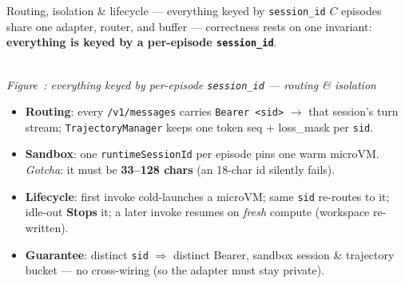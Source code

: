 \documentclass[aspectratio=169]{beamer}
\newcounter{deckfig}
\newcommand{\figtag}[1]{\refstepcounter{deckfig}%
  {\scriptsize\itshape Figure~\thedeckfig: #1}}
\begin{document}
\begin{frame}{Routing, isolation \& lifecycle --- everything keyed by \texttt{session\_id}}
  \footnotesize $C$ episodes share one adapter, router, and buffer --- correctness rests on one invariant:
  \textbf{everything is keyed by a per-episode \texttt{session\_id}}.
  \begin{center}
  \\[0.1em]\figtag{everything keyed by per-episode \texttt{session\_id} --- routing \& isolation}
  \end{center}
  \vspace{-0.35em}
  \begin{itemize}\setlength\itemsep{0.08em}
    \item \textbf{Routing}: every \texttt{/v1/messages} carries \texttt{Bearer <sid>} $\to$ that session's
      turn stream; \texttt{TrajectoryManager} keeps one token seq + loss\_mask per \texttt{sid}.
    \item \textbf{Sandbox}: one \texttt{runtimeSessionId} per episode pins one warm microVM. \emph{Gotcha}:
      it must be \textbf{33--128 chars} (an 18-char id silently fails).
    \item \textbf{Lifecycle}: first invoke cold-launches a microVM; same \texttt{sid} re-routes to it;
      idle-out \textbf{Stops} it; a later invoke resumes on \emph{fresh} compute (workspace re-written).
    \item \textbf{Guarantee}: distinct \texttt{sid} $\Rightarrow$ distinct Bearer, sandbox session \& trajectory
      bucket --- no cross-wiring (so the adapter must stay private).
  \end{itemize}
\end{frame}
\end{document}
